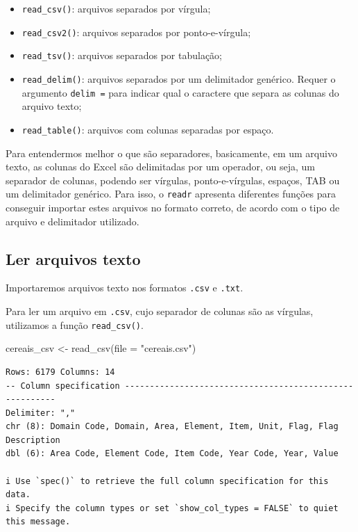 \documentclass[
  brazilian,
]{book}
\newenvironment{Shaded}{\begin{snugshade}}{\end{snugshade}}
\newcommand{\AttributeTok}[1]{\textcolor[rgb]{0.77,0.63,0.00}{#1}}
\newcommand{\FunctionTok}[1]{\textcolor[rgb]{0.00,0.00,0.00}{#1}}
\newcommand{\NormalTok}[1]{#1}
\newcommand{\OtherTok}[1]{\textcolor[rgb]{0.56,0.35,0.01}{#1}}
\newcommand{\StringTok}[1]{\textcolor[rgb]{0.31,0.60,0.02}{#1}}
\begin{document}
\begin{itemize}
\item
  \texttt{read\_csv()}: arquivos separados por vírgula;
\item
  \texttt{read\_csv2()}: arquivos separados por ponto-e-vírgula;
\item
  \texttt{read\_tsv()}: arquivos separados por tabulação;
\item
  \texttt{read\_delim()}: arquivos separados por um delimitador genérico. Requer o argumento \texttt{delim\ =} para indicar qual o caractere que separa as colunas do arquivo texto;
\item
  \texttt{read\_table()}: arquivos com colunas separadas por espaço.
\end{itemize}

Para entendermos melhor o que são separadores, basicamente, em um arquivo texto, as colunas do Excel são delimitadas por um operador, ou seja, um separador de colunas, podendo ser vírgulas, ponto-e-vírgulas, espaços, TAB ou um delimitador genérico. Para isso, o \texttt{readr} apresenta diferentes funções para conseguir importar estes arquivos no formato correto, de acordo com o tipo de arquivo e delimitador utilizado.

\hypertarget{ler-arquivos-texto}{%
\subsection{Ler arquivos texto}\label{ler-arquivos-texto}}

Importaremos arquivos texto nos formatos \texttt{.csv} e \texttt{.txt}.

Para ler um arquivo em \texttt{.csv}, cujo separador de colunas são as vírgulas, utilizamos a função \texttt{read\_csv()}.

\begin{Shaded}
\begin{Highlighting}[]
\NormalTok{cereais\_csv }\OtherTok{\textless{}{-}} \FunctionTok{read\_csv}\NormalTok{(}\AttributeTok{file =} \StringTok{"cereais.csv"}\NormalTok{)}
\end{Highlighting}
\end{Shaded}

\begin{verbatim}
Rows: 6179 Columns: 14
-- Column specification --------------------------------------------------------
Delimiter: ","
chr (8): Domain Code, Domain, Area, Element, Item, Unit, Flag, Flag Description
dbl (6): Area Code, Element Code, Item Code, Year Code, Year, Value

i Use `spec()` to retrieve the full column specification for this data.
i Specify the column types or set `show_col_types = FALSE` to quiet this message.
\end{verbatim}
\end{document}
